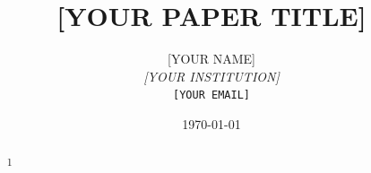 

\title{[YOUR PAPER TITLE]}

\author{[YOUR NAME]\\
  \textit{[YOUR INSTITUTION]}\\
  \texttt{[YOUR EMAIL]}}

\date{\today}



\maketitle

\begin{abstract}
\begin{spacing}{1}
\end{spacing}
\end{abstract}

\newpage
\tableofcontents
\newpage












\newpage



